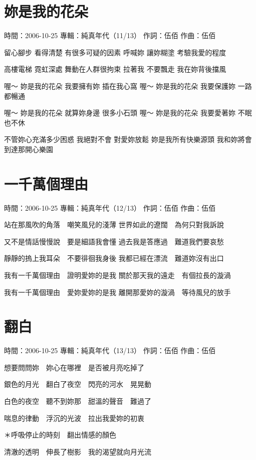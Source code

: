 \documentclass[UTF8,a4paper,oneside,twocolumn,12pt]{ctexbook}
\newcommand{\infopair}[2]{\textbullet #1：#2}
\newcommand{\zc}[1][伍佰]{\infopair{作詞}{#1}}
\newcommand{\zq}[1][伍佰]{\infopair{作曲}{#1}}
\newcommand{\zj}[1]{\infopair{專輯}{#1}}
\newcommand{\sj}[1]{\infopair{時間}{#1}}
\newenvironment{info}{\begin{flushleft}\kaishu
	}
	{\end{flushleft}\normalsize\yahei\par}
\newenvironment{lyric}{
	}
{}
\begin{document}
\section{妳是我的花朵}
\begin{info}
	\sj{2006-10-25}
	\zj{純真年代（11/13）}
	\zc
	\zq
\end{info}
\begin{lyric}
	留心腳步 看得清楚 有很多可疑的因素
	呼喊妳 讓妳糊塗 考驗我愛的程度

	高樓電梯 霓虹深處 舞動在人群很拘束
	拉著我 不要飄走 我在妳背後擋風

	喔～ 妳是我的花朵 我要擁有妳 插在我心窩
	喔～ 妳是我的花朵 我要保護妳 一路都暢通

	喔～ 妳是我的花朵 就算妳身邊 很多小石頭
	喔～ 妳是我的花朵 我要愛著妳 不眠也不休

	不管妳心充滿多少困惑 我絕對不會 對愛妳放鬆
	妳是我所有快樂源頭 我和妳將會 到達那開心樂園
\end{lyric}

\section{一千萬個理由}
\begin{info}
	\sj{2006-10-25}
	\zj{純真年代（12/13）}
	\zc
	\zq
\end{info}
\begin{lyric}
	站在那風吹的角落　嘲笑風兒的淺薄
	世界如此的遼闊　為何只對我訴說

	又不是情話慢慢說　要是細語我會懂
	過去我是答應過　難道我們要哀愁

	靜靜的摀上我耳朵　不要徘徊我身後
	我都已經在漂流　難道妳沒有出口

	我有一千萬個理由　證明愛妳的是我
	關於那天我的遠走　有個拉長的漩渦

	我有一千萬個理由　愛妳愛妳的是我
	離開那愛妳的漩渦　等待風兒的放手
\end{lyric}

\section{翻白}
\begin{info}
	\sj{2006-10-25}
	\zj{純真年代（13/13）}
	\zc
	\zq
\end{info}
\begin{lyric}
	想要問問妳　妳心在哪裡　是否被月亮吃掉了

	銀色的月光　翻白了夜空　閃亮的河水　晃晃動

	白色的夜空　聽不到妳那　甜溫的聲音　難過了

	喘息的律動　浮沉的光波　拉出我愛妳的初衷

	＊呼吸停止的時刻　翻出情感的顏色

	清澈的透明　伸長了樹影　我的渴望就向月光流
\end{lyric}
\end{document}
